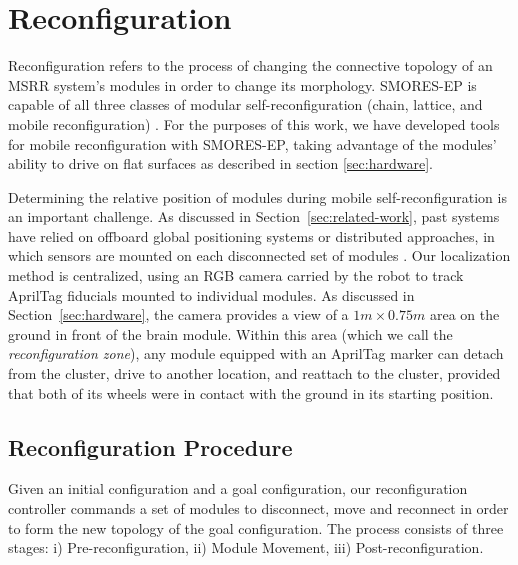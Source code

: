 \documentclass[conference]{IEEEtran}
\newcommand{\TODO}[1]{ {\bf \textcolor{red}{TODO:} #1 }}
\begin{document}
\section{Reconfiguration}
\label{sec:reconfiguration}
%
Reconfiguration refers to the process of changing the connective topology of an MSRR system's modules in order to change its morphology.  SMORES-EP is capable of all three classes of modular self-reconfiguration (chain, lattice, and mobile reconfiguration) \cite{Davey2012,yim2003modular}.  For the purposes of this work, we have developed tools for mobile reconfiguration with SMORES-EP, taking advantage of the modules' ability to drive on flat surfaces as described in section \ref{sec:hardware}.

Determining the relative position of modules during mobile self-reconfiguration is an important challenge. As discussed in Section~\ref{sec:related-work}, past systems have relied on offboard global positioning systems \cite{Paulos2015} or distributed approaches, in which sensors are mounted on each disconnected set of modules \cite{Yim2007}.  Our localization method is centralized, using an RGB camera carried by the robot to track AprilTag fiducials mounted to individual modules.  As discussed in Section~\ref{sec:hardware}, the camera provides a view of a $1m\times0.75m$ area on the ground in front of the brain module.  Within this area (which we call the \emph{reconfiguration zone}), any module equipped with an AprilTag marker can detach from the cluster, drive to another location, and reattach to the cluster, provided that both of its wheels were in contact with the ground in its starting position.%

\subsection{Reconfiguration Procedure}
Given an initial configuration and a goal configuration, our reconfiguration controller commands a set of modules to disconnect, move and reconnect in order to form the new topology of the goal configuration. The process consists of three stages: i) Pre-reconfiguration, ii) Module Movement, iii) Post-reconfiguration.
\end{document}
